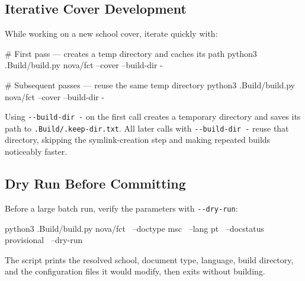 
\subsection{Iterative Cover Development}
\label{sec:buildpy_iterative}

While working on a new school cover, iterate quickly with:

\begin{bashcode}
# First pass — creates a temp directory and caches its path
python3 .Build/build.py nova/fct --cover --build-dir -

# Subsequent passes — reuse the same temp directory
python3 .Build/build.py nova/fct --cover --build-dir -
\end{bashcode}

Using \verb!--build-dir -! on the first call creates a temporary directory
and saves its path to \verb!.Build/.keep-dir.txt!.  All later calls with
\verb!--build-dir -! reuse that directory, skipping the symlink-creation
step and making repeated builds noticeably faster.

\subsection{Dry Run Before Committing}
\label{sec:buildpy_dryrun}

Before a large batch run, verify the parameters with \verb!--dry-run!:

\begin{bashcode}
python3 .Build/build.py nova/fct \
    --doctype msc \
    --lang pt \
    --docstatus provisional \
    --dry-run
\end{bashcode}

The script prints the resolved school, document type, language, build
directory, and the configuration files it would modify, then exits without
building.


